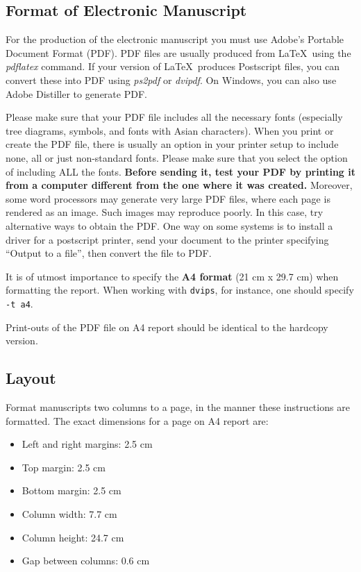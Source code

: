 \documentclass[11pt]{article}
\begin{document}
\subsection{Format of Electronic Manuscript}
\label{sect:pdf}

For the production of the electronic manuscript you must use Adobe's
Portable Document Format (PDF). PDF files are usually produced from
\LaTeX\ using the \textit{pdflatex} command. If your version of
\LaTeX\ produces Postscript files, you can convert these into PDF
using \textit{ps2pdf} or \textit{dvipdf}. On Windows, you can also use
Adobe Distiller to generate PDF.

Please make sure that your PDF file includes all the necessary fonts
(especially tree diagrams, symbols, and fonts with Asian
characters). When you print or create the PDF file, there is usually
an option in your printer setup to include none, all or just
non-standard fonts.  Please make sure that you select the option of
including ALL the fonts. \textbf{Before sending it, test your PDF by
  printing it from a computer different from the one where it was
  created.} Moreover, some word processors may generate very large PDF
files, where each page is rendered as an image. Such images may
reproduce poorly. In this case, try alternative ways to obtain the
PDF. One way on some systems is to install a driver for a postscript
printer, send your document to the printer specifying ``Output to a
file'', then convert the file to PDF.

It is of utmost importance to specify the \textbf{A4 format} (21 cm
x 29.7 cm) when formatting the report. When working with
{\tt dvips}, for instance, one should specify {\tt -t a4}.

Print-outs of the PDF file on A4 report should be identical to the
hardcopy version.


\subsection{Layout}
\label{ssec:layout}

Format manuscripts two columns to a page, in the manner these
instructions are formatted. The exact dimensions for a page on A4
report are:

\begin{itemize}
\item Left and right margins: 2.5 cm
\item Top margin: 2.5 cm
\item Bottom margin: 2.5 cm
\item Column width: 7.7 cm
\item Column height: 24.7 cm
\item Gap between columns: 0.6 cm
\end{itemize}
\end{document}
